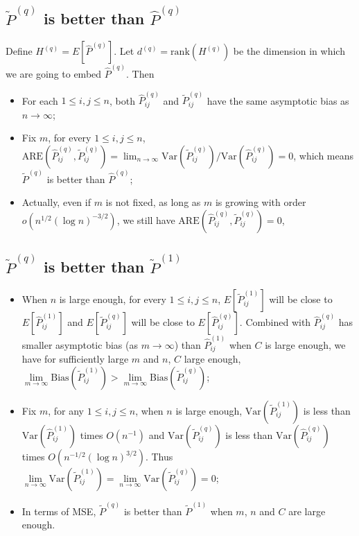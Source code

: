 \documentclass[a4paper]{article}
\begin{document}
\subsection{$\widetilde{P}^{(q)}$ is better than $\hat{P}^{(q)}$}
Define $H^{(q)} = E[\hat{P}^{(q)}]$.
Let $d^{(q)} = \mathrm{rank}(H^{(q)})$ be the dimension in which we are going to embed $\hat{P}^{(q)}$.
Then
\begin{itemize}
	\item For each $1 \le i, j \le n$, both $\hat{P}_{ij}^{(q)}$ and $\widetilde{P}_{ij}^{(q)}$ have the same asymptotic bias as $n \to \infty$;
    \item Fix $m$, for every $1 \le i,j \le n$, $\mathrm{ARE}(\hat{P}_{ij}^{(q)}, \widetilde{P}_{ij}^{(q)}) = \lim_{n \to \infty} \mathrm{Var}(\widetilde{P}_{ij}^{(q)})/\mathrm{Var}(\hat{P}_{ij}^{(q)}) = 0$, which means $\widetilde{P}^{(q)}$ is better than $\hat{P}^{(q)}$;
    \item Actually, even if $m$ is not fixed, as long as $m$ is growing with order $o(n^{1/2}(\log n)^{-3/2})$, we still have $\mathrm{ARE}(\hat{P}_{ij}^{(q)}, \widetilde{P}_{ij}^{(q)}) = 0$, 
\end{itemize}






\subsection{$\widetilde{P}^{(q)}$ is better than $\widetilde{P}^{(1)}$}
\begin{itemize}
	\item When $n$ is large enough, for every $1 \le i,j \le n$, $E[\widetilde{P}_{ij}^{(1)}]$ will be close to $E[\hat{P}_{ij}^{(1)}]$ and $E[\widetilde{P}_{ij}^{(q)}]$ will be close to $E[\hat{P}_{ij}^{(q)}]$. Combined with $\hat{P}_{ij}^{(q)}$ has smaller asymptotic bias (as $m \to \infty$) than $\hat{P}_{ij}^{(1)}$ when $C$ is large enough, we have for sufficiently large $m$ and $n$, $C$ large enough, $\underset{m \to \infty}{\lim} \mathrm{Bias}(\widetilde{P}_{ij}^{(1)}) > \underset{m \to \infty}{\lim} \mathrm{Bias}(\widetilde{P}_{ij}^{(q)})$;
    \item Fix $m$, for any $1 \le i,j \le n$, when $n$ is large enough, $\mathrm{Var}(\widetilde{P}_{ij}^{(1)})$ is less than $\mathrm{Var}(\hat{P}_{ij}^{(1)})$ times $O(n^{-1})$ and $\mathrm{Var}(\widetilde{P}_{ij}^{(q)})$ is less than $\mathrm{Var}(\hat{P}_{ij}^{(q)})$ times $O(n^{-1/2} (\log n)^{3/2})$. Thus $\underset{n \to \infty}{\lim} \mathrm{Var}(\widetilde{P}_{ij}^{(1)}) = \underset{n \to \infty}{\lim} \mathrm{Var}(\widetilde{P}_{ij}^{(q)}) = 0$;
    \item In terms of MSE, $\widetilde{P}^{(q)}$ is better than $\widetilde{P}^{(1)}$ when $m$, $n$ and $C$ are large enough.
\end{itemize}
\end{document}
